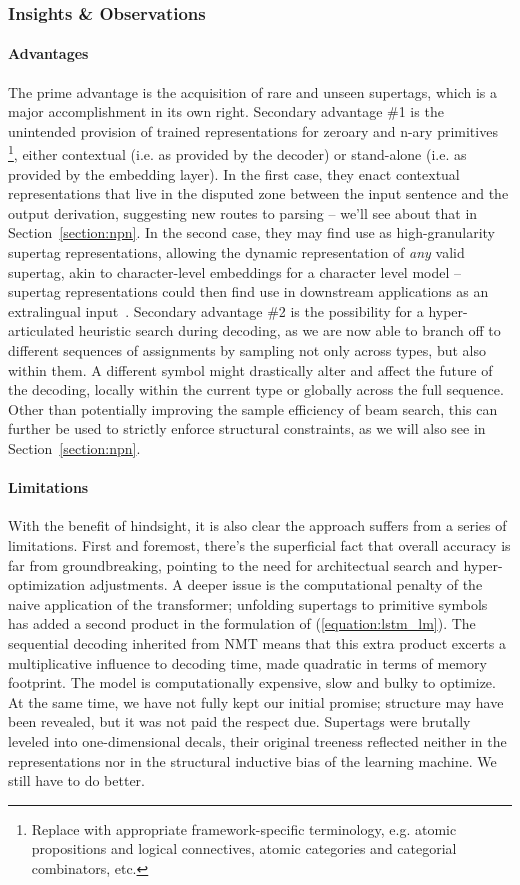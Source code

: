 \subsubsection{Insights \& Observations}
\paragraph{Advantages}
The prime advantage is the acquisition of rare and unseen supertags, which is a major accomplishment in its own right.
Secondary advantage \#1 is the unintended provision of trained representations for zeroary and n-ary primitives%
	\footnote{Replace with appropriate framework-specific terminology, e.g. atomic propositions and logical connectives, atomic categories and categorial combinators, etc.},
either contextual (i.e. as provided by the decoder) or stand-alone (i.e. as provided by the embedding layer).
In the first case, they enact contextual representations that live in the disputed zone between the input sentence and the output derivation, suggesting new routes to parsing -- we'll see about that in Section~\ref{section:npn}.
In the second case, they may find use as high-granularity supertag representations, allowing the dynamic representation of \textit{any} valid supertag, akin to character-level embeddings for a character level model -- supertag representations could then find use in downstream applications as an extralingual input~\cite{kasai-etal-2017-tag}.
Secondary advantage \#2 is the possibility for a hyper-articulated heuristic search during decoding, as we are now able to branch off to different sequences of assignments by sampling not only across types, but also within them.
A different symbol might drastically alter and affect the future of the decoding, locally within the current type or globally across the full sequence.
Other than potentially improving the sample efficiency of beam search, this can further be used to strictly enforce structural constraints, as we will also see in Section~\ref{section:npn}.

\paragraph{Limitations}
With the benefit of hindsight, it is also clear the approach suffers from a series of limitations.
First and foremost, there's the superficial fact that overall accuracy is far from groundbreaking, pointing to the need for architectual search and hyper-optimization adjustments.
A deeper issue is the computational penalty of the naive application of the transformer; unfolding supertags to primitive symbols has added a second product in the formulation of (\ref{equation:lstm_lm}).
The sequential decoding inherited from NMT means that this extra product excerts a multiplicative influence to decoding time, made quadratic in terms of memory footprint.
The model is computationally expensive, slow and bulky to optimize.
At the same time, we have not fully kept our initial promise; structure may have been revealed, but it was not paid the respect due.
Supertags were brutally leveled into one-dimensional decals, their original treeness reflected neither in the representations nor in the structural inductive bias of the learning machine.
We still have to do better.

